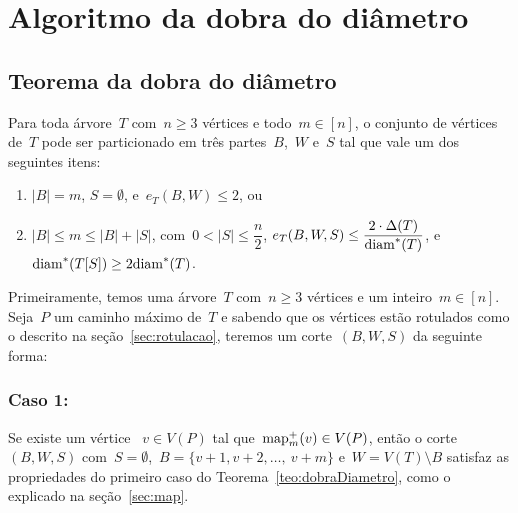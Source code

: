 \section {Algoritmo da dobra do diâmetro}
\label{sec:dobraDiametro}
	\subsection{Teorema da dobra do diâmetro}
	
		\begin{teo}
		\label{teo:dobraDiametro}
			Para toda árvore~$T$ com~$n\ge 3$ vértices e 
			todo~$m\in [n]$,
			o conjunto de vértices de~$T$ pode ser particionado em 
			três partes~$B$,~$W$ e~$S$ tal que vale um dos 
			seguintes itens:
			\begin{enumerate}
				\item ${|B|=m}$, ${S=\emptyset}$, e~${e_T(B,W)\le 2}$, ou
				\item ${|B|\le m\le |B|+|S|}$, 
				com~${0<|S|\le\dfrac{n}{2}}$,
				${e_T(B,W,S)\le \dfrac{2\cdot 
				\Delta(T)}{\mathrm{diam}^*(T)}}$, 
				e~${\mathrm{diam}^*(T[S])\ge 2\mathrm{diam}^*(T)}$.
			\end{enumerate}
		\end{teo}

	\bigskip
	\bigskip



		Primeiramente, temos uma árvore~$T$ com~${n\ge 3}$ vértices e um 
		inteiro~${m\in[n]}$.
		Seja~$P$ um caminho máximo de~$T$ e sabendo que os vértices
		estão rotulados como o descrito na seção~\ref{sec:rotulacao},
		teremos um corte~$(B,W,S)$ da seguinte forma:
		\bigskip
		\bigskip
	
	\subsubsection*{Caso 1:}
			Se existe um vértice ~${v\in V(P)}$ tal 
			que~${\mathrm{map}_m^+(v)\in V(P)}$, então o 
			corte~$(B,W,S)$ 
			com~${S=\emptyset}$,~${B =\{v+1, v+2,\ldots,~v+m\}}$
			e~${W=V(T)\setminus B}$ satisfaz as propriedades do
			primeiro caso do Teorema~\ref{teo:dobraDiametro},
			como o explicado na seção~\ref{sec:map}.

